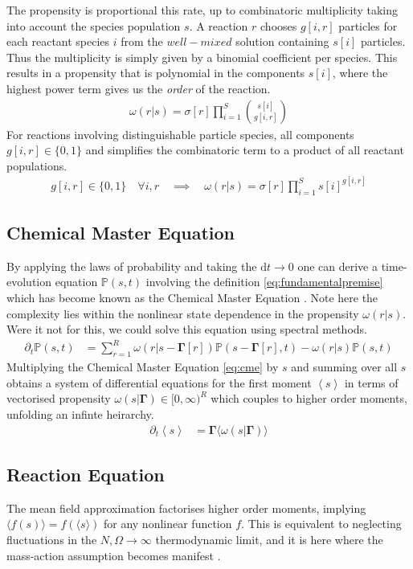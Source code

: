 The propensity is proportional this rate, up to combinatoric multiplicity
taking into account the species population $s$. A reaction $r$ chooses $g[i,r]$
particles for each reactant species $i$ from the $well-mixed$ solution containing
$s[i]$ particles. Thus the multiplicity is simply given by a binomial coefficient
per species. This results in a propensity that is polynomial in the components
$s[i]$, where the highest power term gives us the \textit{order} of the reaction.
\begin{align}
	\omega(r|s)=
	\sigma[r]
		\prod_{i=1}^S{s[i] \choose g[i,r]}
	\label{eq:propensity}
\end{align}
For reactions involving distinguishable particle species, all
components $ g[i,r]\in\{ 0,1\}$ and simplifies the combinatoric term to a
product of all reactant populations.
\begin{align}
	g[i,r]\in\{ 0,1\}\quad\forall i,r\quad\implies\quad
	\omega(r|s)=
	\sigma[r]
	\prod_{i=1}^S s[i]^{g[i,r]}
	\label{eq:simplifiedpropensity}
\end{align}
\subsection{Chemical Master Equation}
By applying the laws of probability and taking the $\mathrm{d}t\rightarrow 0$
one can derive a time-evolution equation
$\mathbb{P}(s,t)$ involving the definition \eqref{eq:fundamentalpremise} which
has become known as the Chemical Master Equation \cite{Gillespie1992,Gillespie2007}.
Note here the complexity lies within the nonlinear state dependence in the propensity
$\omega(r|s)$. Were it not for this, we could solve this equation using
spectral methods.
\begin{align}
	\partial_t\mathbb{P}(s,t) &=
	\sum_{r=1}^R
	\omega(r|s-\mathbf{\Gamma}[r])\mathbb{P}(s-\mathbf{\Gamma}[r],t)-\omega(r|s)\mathbb{P}(s,t)
	\label{eq:cme}
\end{align}
Multiplying the Chemical Master Equation \eqref{eq:cme} by $s$ and summing over all $s$
obtains a system of differential equations for the first moment
$\left\langle s \right\rangle$ in terms of vectorised propensity
$\omega(s|\mathbf{\Gamma})\in[0,\infty)^R$ which couples to higher order moments,
unfolding an infinte heirarchy.
\begin{align}
	\partial_t
	\left\langle s \right\rangle &=
	\mathbf{\Gamma} \big\langle \omega(s|\mathbf{\Gamma}) \big\rangle
	\label{eq:momentheirarchy}
\end{align}
\subsection{Reaction Equation}
The mean field approximation factorises higher order moments, implying
$\big\langle f(s) \big\rangle=f(\langle s\rangle)$ for any nonlinear
function $f$. This is equivalent to neglecting fluctuations in the
$N,\Omega\rightarrow\infty$
thermodynamic limit, and it is here where the mass-action assumption
becomes manifest \cite{Gillespie2007}.

